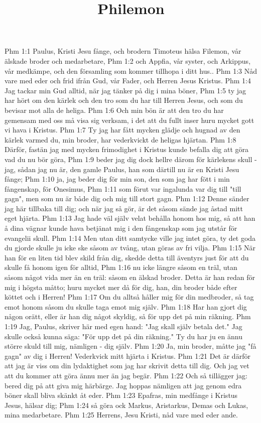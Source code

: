 

\title{Philemon}

Phm 1:1  Paulus, Kristi Jesu fånge, och brodern Timoteus hälsa Filemon, vår älskade broder och medarbetare,
Phm 1:2  och Appfia, vår syster, och Arkippus, vår medkämpe, och den församling som kommer tillhopa i ditt hus..
Phm 1:3  Nåd vare med eder och frid ifrån Gud, vår Fader, och Herren Jesus Kristus.
Phm 1:4  Jag tackar min Gud alltid, när jag tänker på dig i mina böner,
Phm 1:5  ty jag har hört om den kärlek och den tro som du har till Herren Jesus, och som du bevisar mot alla de heliga.
Phm 1:6  Och min bön är att den tro du har gemensam med oss må visa sig verksam, i det att du fullt inser huru mycket gott vi hava i Kristus.
Phm 1:7  Ty jag har fått mycken glädje och hugnad av den kärlek varmed du, min broder, har vederkvickt de heligas hjärtan.
Phm 1:8  Därför, fastän jag med mycken frimodighet i Kristus kunde befalla dig att göra vad du nu bör göra,
Phm 1:9  beder jag dig dock hellre därom för kärlekens skull - jag, sådan jag nu är, den gamle Paulus, han som därtill nu är en Kristi Jesu fånge;
Phm 1:10  ja, jag beder dig för min son, den som jag har fött i min fångenskap, för Onesimus,
Phm 1:11  som förut var ingalunda var dig till "till gagn", men som nu är både dig och mig till stort gagn.
Phm 1:12  Denne sänder jag här tillbaka till dig; och när jag så gör, är det såsom sände jag åstad mitt eget hjärta.
Phm 1:13  Jag hade väl själv velat behålla honom hos mig, så att han å dina vägnar kunde hava betjänat mig i den fångenskap som jag utstår för evangelii skull.
Phm 1:14  Men utan ditt samtycke ville jag intet göra, ty det goda du gjorde skulle ju icke ske såsom av tvång, utan göras av fri vilja.
Phm 1:15  När han för en liten tid blev skild från dig, skedde detta till äventyrs just för att du skulle få honom igen för alltid,
Phm 1:16  nu icke längre såsom en träl, utan såsom något vida mer än en träl: såsom en älskad broder. Detta är han redan för mig i högsta måtto; huru mycket mer då för dig, han, din broder både efter köttet och i Herren!
Phm 1:17  Om du alltså håller mig för din medbroder, så tag emot honom såsom du skulle taga emot mig själv.
Phm 1:18  Har han gjort dig någon orätt, eller är han dig något skyldig, så för upp det på min räkning.
Phm 1:19  Jag, Paulus, skriver här med egen hand: "Jag skall själv betala det." Jag skulle också kunna säga: "För upp det på din räkning." Ty du har ju en ännu större skuld till mig, nämligen - dig själv.
Phm 1:20  Ja, min broder, måtte jag "få gagn" av dig i Herren! Vederkvick mitt hjärta i Kristus.
Phm 1:21  Det är därför att jag är viss om din lydaktighet som jag har skrivit detta till dig. Och jag vet att du kommer att göra ännu mer än jag begär.
Phm 1:22  Och så tillägger jag: bered dig på att giva mig härbärge. Jag hoppas nämligen att jag genom edra böner skall bliva skänkt åt eder.
Phm 1:23  Epafras, min medfånge i Kristus Jesus, hälsar dig;
Phm 1:24  så göra ock Markus, Aristarkus, Demas och Lukas, mina medarbetare.
Phm 1:25  Herrens, Jesu Kristi, nåd vare med eder ande.


